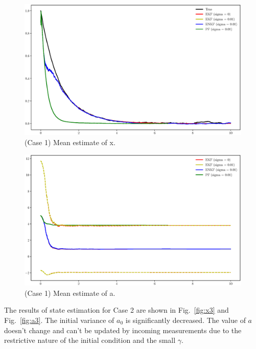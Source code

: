 \documentclass[]{elsarticle}
\begin{document}
\begin{figure}[!htb]
\centering
\includegraphics[width=\linewidth,keepaspectratio]{./figs/case00_x_estimate2.eps}
\caption{(Case 1) Mean estimate of x.}
\label{fig:x2}
\end{figure}

\begin{figure}[!htb]
\centering
\includegraphics[width=\linewidth,keepaspectratio]{./figs/case00_a_estimate2.eps}
\caption{(Case 1) Mean estimate of a.}
\label{fig:a2}
\end{figure}
 
The results of state estimation for Case 2 are shown in Fig.~\ref{fig:x3} and Fig.~\ref{fig:a3}. The initial variance of $a_0$ is significantly decreased. The value of $a$ doesn't change and can't be updated by incoming measurements due to the restrictive nature of the initial condition and the small $\gamma$.
\end{document}
